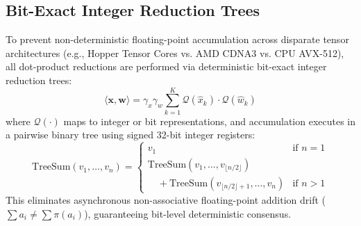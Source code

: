 \documentclass[10pt,twocolumn,letterpaper]{article}
\begin{document}
\subsection{Bit-Exact Integer Reduction Trees}
To prevent non-deterministic floating-point accumulation across disparate tensor architectures (e.g., Hopper Tensor Cores vs. AMD CDNA3 vs. CPU AVX-512), all dot-product reductions are performed via deterministic bit-exact integer reduction trees:
\begin{equation}
\langle \mathbf{x}, \mathbf{w} \rangle = \gamma_x \gamma_w \sum_{k=1}^K \mathcal{Q}(\hat{x}_k) \cdot \mathcal{Q}(\hat{w}_k)
\end{equation}
where $\mathcal{Q}(\cdot)$ maps to integer or bit representations, and accumulation executes in a pairwise binary tree using signed 32-bit integer registers:
\begin{equation}
\text{TreeSum}(v_1, \dots, v_n) = \begin{cases} 
v_1 & \text{if } n = 1 \\ 
\text{TreeSum}(v_1, \dots, v_{\lfloor n/2 \rfloor}) \\
\quad + \text{TreeSum}(v_{\lfloor n/2 \rfloor + 1}, \dots, v_n) & \text{if } n > 1 
\end{cases}
\end{equation}
This eliminates asynchronous non-associative floating-point addition drift ($\sum a_i \neq \sum \pi(a_i)$), guaranteeing bit-level deterministic consensus.
\end{document}
